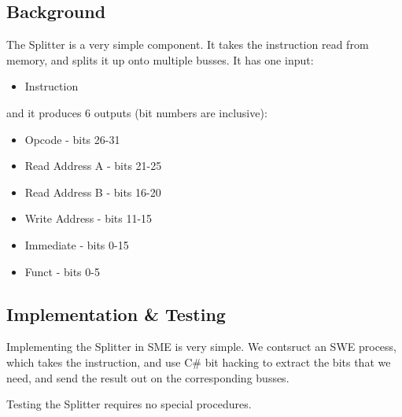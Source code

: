 \documentclass{beamer}
\begin{document}
\subsection{Background}
\begin{frame}
    The Splitter is a very simple component. It takes the instruction read from
    memory, and splits it up onto multiple busses. It has one input:
    \begin{itemize}
        \item Instruction
    \end{itemize}
    and it produces 6 outputs (bit numbers are inclusive):
    \begin{itemize}
        \item Opcode - bits 26-31
        \item Read Address A - bits 21-25
        \item Read Address B - bits 16-20
        \item Write Address - bits 11-15
        \item Immediate - bits 0-15
        \item Funct - bits 0-5
    \end{itemize}
\end{frame}
\begin{frame}
    \begin{figure}
    \end{figure}
\end{frame}
\subsection{Implementation \& Testing}
\begin{frame}
    Implementing the Splitter in SME is very simple. We contsruct an SWE
    process, which takes the instruction, and use C\# bit hacking to extract
    the bits that we need, and send the result out on the corresponding busses.

    \vspace{\baselineskip}
    Testing the Splitter requires no special procedures.
\end{frame}
\end{document}

